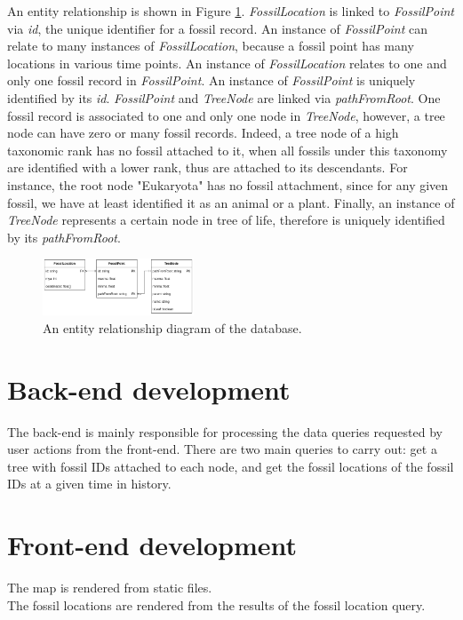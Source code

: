 \documentclass[11pt, a4paper,oneside,chapterprefix=false]{scrbook}
\begin{document}
An entity relationship is shown in Figure \ref{fig:er}. \emph{FossilLocation} is linked to \emph{FossilPoint} via \emph{id}, the unique identifier for a fossil record. An instance of \emph{FossilPoint} can relate to many instances of \emph{FossilLocation}, because a fossil point has many locations in various time points. An instance of \emph{FossilLocation} relates to one and only one fossil record in \emph{FossilPoint}. An instance of \emph{FossilPoint} is uniquely identified by its \emph{id}. \emph{FossilPoint} and \emph{TreeNode} are linked via \emph{pathFromRoot}. One fossil record is associated to one and only one node in \emph{TreeNode}, however, a tree node can have zero or many fossil records. Indeed, a tree node of a high taxonomic rank has no fossil attached to it, when all fossils under this taxonomy are identified with a lower rank, thus are attached to its descendants. For instance, the root node "Eukaryota" has no fossil attachment, since for any given fossil, we have at least identified it as an animal or a plant. Finally, an instance of \emph{TreeNode} represents a certain node in tree of life, therefore is uniquely identified by its \emph{pathFromRoot}.
\begin{figure}[h]
	\centering
	\includegraphics[width=0.4\textwidth]{figures/technical_solution/er}
	\caption{An entity relationship diagram of the database.}
	\label{fig:er}
\end{figure}
\section{Back-end development} \label{sec:tec_backend}
The back-end is mainly responsible for processing the data queries requested by user actions from the front-end. There are two main queries to carry out: get a tree with fossil IDs attached to each node, and get the fossil locations of the fossil IDs at a given time in history. 

\section{Front-end development} \label{sec:tec_frontend}
The map is rendered from static files.\\

The fossil locations are rendered from the results of the fossil location query. \\
\end{document}
